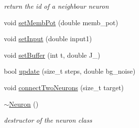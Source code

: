 \begin{DoxyCompactItemize}
\begin{DoxyCompactList}\small\item\em return the id of a neighbour neuron \end{DoxyCompactList}\item 
void \hyperlink{classNeuron_a4b0247897b7ce0bae648adbe4afcd31b}{set\-Memb\-Pot} (double memb\-\_\-pot)
\item 
void \hyperlink{classNeuron_ad1fd76083e7286403100452ff405514c}{set\-Input} (double input1)
\item 
void \hyperlink{classNeuron_a2cebb10fbc6398de17af51245bcc694f}{set\-Buffer} (int t, double J\-\_\-)
\item 
bool \hyperlink{classNeuron_a4aa92966b7bfe66cf1cdce4f05aea2b5}{update} (size\-\_\-t steps, double bg\-\_\-noise)
\item 
void \hyperlink{classNeuron_a367148f52e712682da9d0c278353f7ed}{connect\-Two\-Neurons} (size\-\_\-t target)
\item 
\hypertarget{classNeuron_a94a250ce7e167760e593979b899745b1}{\hyperlink{classNeuron_a94a250ce7e167760e593979b899745b1}{$\sim$\-Neuron} ()}\label{classNeuron_a94a250ce7e167760e593979b899745b1}

\begin{DoxyCompactList}\small\item\em destructor of the neuron class \end{DoxyCompactList}\end{DoxyCompactItemize}
